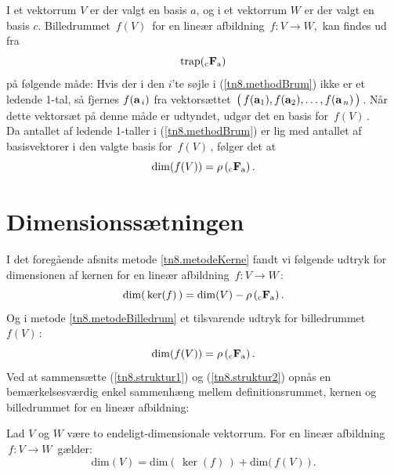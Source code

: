 \begin{method}\label{tn8.metodeBilledrum}
I et vektorrum $V$ er der valgt en basis $a$, og i et vektorrum $W$ er der valgt en basis $c$. Billedrummet $\,f(V)\,$ for en lineær afbildning $\,f:V\rightarrow W,$ kan findes ud fra
\begin{equation}\label{tn8.methodBrum}
\mathrm{trap}({_\mathrm{c}\mathbf{F}_\mathrm{a}})
\end{equation}
på følgende måde: Hvis der i den $i$'te søjle i (\ref{tn8.methodBrum}) ikke er et ledende 1-tal, så fjernes $f(\mathbf{a}_{\,i})$ fra vektorsættet $\,\big(\,f(\mathbf{a}_1),f(\mathbf{a}_2),\ldots,f(\mathbf{a}_{\,n})\,\big)\,$. Når dette vektorsæt på denne måde er udtyndet, udgør det en basis for $\,f(V)\,$.\\

Da antallet af ledende 1-taller i (\ref{tn8.methodBrum}) er lig med antallet af basisvektorer i den valgte basis for $\,f(V)\,$, følger det at 
\begin{equation}\label{tn8.methodBrum2}
\mathrm{dim}(f(V))=\rho\,({_\mathrm{c}\mathbf{F}_\mathrm{a}})\,.
\end{equation}
\end{method}

\section{Dimensionssætningen}

I det foregående afsnits metode \ref{tn8.metodeKerne} fandt vi følgende udtryk for dimensionen af kernen for en lineær afbildning $\,f:V\rightarrow W\,$:
\begin{equation}\label{tn8.struktur1}
\mathrm{dim}(\,\ker(f)\,)=\mathrm{dim}(V)-\rho\,({_\mathrm{c}\mathbf{F}_\mathrm{a}})\,.
\end{equation}
Og i metode \ref{tn8.metodeBilledrum} et tilsvarende udtryk for billedrummet $f(V)\,$:
\begin{equation}\label{tn8.struktur2}
\mathrm{dim}(f(V)) = \rho\,({_\mathrm{c}\mathbf{F}_\mathrm{a}})\,.
\end{equation}
Ved at sammensætte (\ref{tn8.struktur1}) og (\ref{tn8.struktur2}) opnås en bemærkelsesværdig enkel sammenhæng mellem definitionsrummet, kernen og billedrummet for en lineær afbildning:

\begin{theorem}[Dimensionssætningen]\label{tn8.thDimension}
Lad $V$ og $W$ være to endeligt-dimensionale vektorrum. For en lineær afbildning $\,f:V\rightarrow W\,$ gælder:
$$
\mathrm{dim}(V)=\mathrm{dim}(\,\ker(f)\,)+
\mathrm{dim}\big(\,f(V)\,\big)\,.$$
\end{theorem}


